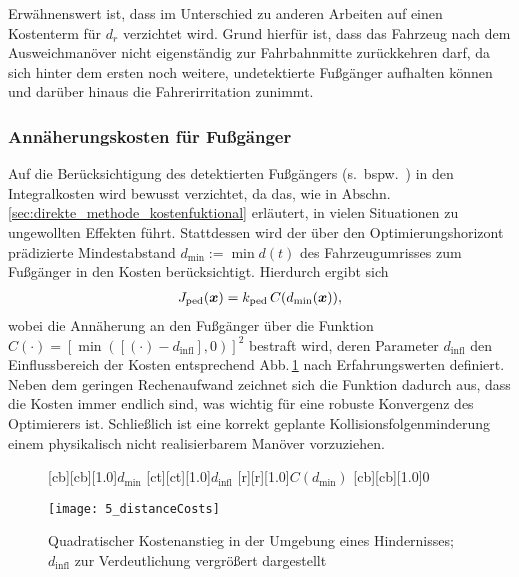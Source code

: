 Erwähnenswert ist, dass im Unterschied zu anderen Arbeiten auf einen Kostenterm für $d_r$ verzichtet wird. Grund hierfür ist, dass das Fahrzeug nach dem Ausweichmanöver nicht eigenständig zur Fahrbahnmitte zurückkehren darf, da sich hinter dem ersten noch weitere, undetektierte Fußgänger aufhalten können und darüber hinaus die Fahrerirritation zunimmt.


\subsubsection{Annäherungskosten für Fußgänger} \label{sec:costs_obstacles}
Auf die Berücksichtigung des detektierten Fußgängers (s.\ bspw.\ \cite{gandhi2007pedestrian}) %
in den Integralkosten wird bewusst verzichtet, da das, wie in Abschn.\,\ref{sec:direkte_methode_kostenfuktional} erläutert, in vielen Situationen zu ungewollten Effekten führt. 
Stattdessen wird der über den Optimierungshorizont prädizierte Mindestabstand $d_{\min } := \min d(t)$ des Fahrzeugumrisses zum Fußgänger in den Kosten berücksichtigt. Hierdurch ergibt sich
\begin{align*}
   J_{\text{ped}}(\boldsymbol{x}) = k_{\text{ped}} \, C(d_{\min}(\boldsymbol{x})),
\end{align*}
wobei die Annäherung an den Fußgänger über die Funktion $C(\cdot) = [\min ([(\cdot)-d_{\text{infl}}],0)]^2$
bestraft wird, deren Parameter $d_{\text{infl}}$ den Einflussbereich der Kosten
entsprechend Abb.\,\ref{fig:distanceCosts} nach Erfahrungswerten
definiert. Neben dem geringen Rechenaufwand zeichnet sich die Funktion dadurch aus,
dass die Kosten immer endlich sind, was wichtig für eine robuste Konvergenz des Optimierers ist. Schließlich ist eine korrekt geplante Kollisionsfolgenminderung einem physikalisch nicht realisierbarem Manöver vorzuziehen.

\begin{figure}[h]
        [cb][cb][1.0]{$d_{\min }$}
        [ct][ct][1.0]{$d_{\text{infl}}$}
				[r][r][1.0]{$C(d_{\min })$}
        [cb][cb][1.0]{$0$}
    \begin{center}
    \texttt{[image: 5\_distanceCosts]}
    \caption[Quadratischer Kostenanstieg in der Umgebung eines Hindernisses]{Quadratischer Kostenanstieg in der Umgebung eines Hindernisses; $d_{\text{infl}}$ zur Verdeutlichung vergrößert dargestellt }
    \label{fig:distanceCosts}
    \end{center}
\end{figure}

